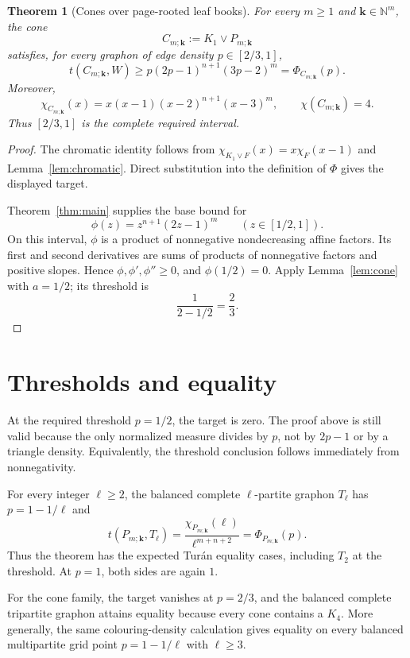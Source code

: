 \documentclass[11pt]{article}
\newtheorem{theorem}{Theorem}[section]
\begin{document}
\begin{theorem}[Cones over page-rooted leaf books]\label{thm:cones}
For every $m\geq1$ and $\mathbf{k}\in\mathbb N^m$, the cone
\[
 C_{m;\mathbf{k}}:=K_1\vee P_{m;\mathbf{k}}
\]
satisfies, for every graphon of edge density $p\in[2/3,1]$,
\[
 \boxed{
 t(C_{m;\mathbf{k}},W)
 \geq p(2p-1)^{n+1}(3p-2)^m
 =\Phi_{C_{m;\mathbf{k}}}(p).
 }
\]
Moreover,
\[
 \chi_{C_{m;\mathbf{k}}}(x)
 =x(x-1)(x-2)^{n+1}(x-3)^m,
 \qquad
 \chi(C_{m;\mathbf{k}})=4.
\]
Thus $[2/3,1]$ is the complete required interval.
\end{theorem}

\begin{proof}
The chromatic identity follows from
$\chi_{K_1\vee F}(x)=x\chi_F(x-1)$ and
Lemma~\ref{lem:chromatic}.  Direct substitution into the definition
of $\Phi$ gives the displayed target.

Theorem~\ref{thm:main} supplies the base bound for
\[
 \phi(z)=z^{n+1}(2z-1)^m
 \qquad (z\in[1/2,1]).
\]
On this interval, $\phi$ is a product of nonnegative nondecreasing
affine factors.  Its first and second derivatives are sums of products
of nonnegative factors and positive slopes.  Hence
$\phi,\phi',\phi''\geq0$, and $\phi(1/2)=0$.  Apply
Lemma~\ref{lem:cone} with $a=1/2$; its threshold is
\[
 \frac1{2-1/2}=\frac23.
\]
\end{proof}


\section{Thresholds and equality}

At the required threshold $p=1/2$, the target is zero.  The proof
above is still valid because the only normalized measure divides by
$p$, not by $2p-1$ or by a triangle density.  Equivalently, the
threshold conclusion follows immediately from nonnegativity.

For every integer $\ell\geq2$, the balanced complete $\ell$-partite
graphon $T_\ell$ has $p=1-1/\ell$ and
\[
 t(P_{m;\mathbf{k}},T_\ell)
 =\frac{\chi_{P_{m;\mathbf{k}}}(\ell)}
        {\ell^{m+n+2}}
 =\Phi_{P_{m;\mathbf{k}}}(p).
\]
Thus the theorem has the expected Tur\'an equality cases, including
$T_2$ at the threshold.  At $p=1$, both sides are again $1$.

For the cone family, the target vanishes at $p=2/3$, and the balanced
complete tripartite graphon attains equality because every cone contains
a $K_4$.  More generally, the same colouring-density calculation gives
equality on every balanced multipartite grid point $p=1-1/\ell$ with
$\ell\geq3$.
\end{document}
